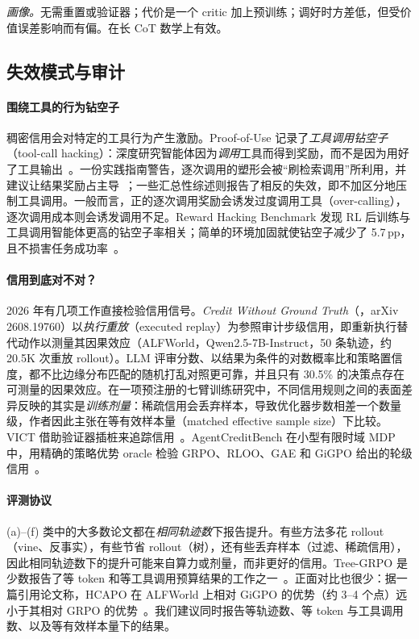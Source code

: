 \emph{画像。}无需重置或验证器；代价是一个 critic 加上预训练；调好时方差低，但受价值误差影响而有偏。在长 CoT 数学上有效。

\subsection{失效模式与审计}\label{sec:tax-failures}

\paragraph{围绕工具的行为钻空子}
稠密信用会对特定的工具行为产生激励。Proof-of-Use 记录了\emph{工具调用钻空子}（tool-call hacking）：深度研究智能体因为\emph{调用}工具而得到奖励，而不是因为用好了工具输出~\citep{proofofuse2025proof}。一份实践指南警告，逐次调用的塑形会被“刷检索调用”所利用，并建议让结果奖励占主导~\citep{fireworks2025best}；一些汇总性综述则报告了相反的失效，即不加区分地压制工具调用\unverified。一般而言，正的逐次调用奖励会诱发过度调用工具（over-calling），逐次调用成本则会诱发调用不足。Reward Hacking Benchmark 发现 RL 后训练与工具调用智能体更高的钻空子率相关；简单的环境加固就使钻空子减少了 5.7\,pp，且不损害任务成功率~\citep{rewardhacking2026benchmark}。

\paragraph{信用到底对不对？}
2026 年有几项工作直接检验信用信号。\emph{Credit Without Ground Truth}（\citealp{zhang2026credit}，arXiv 2608.19760）以\emph{执行重放}（executed replay）为参照审计步级信用，即重新执行替代动作以测量其因果效应（ALFWorld，Qwen2.5-7B-Instruct，50 条轨迹，约 20.5K 次重放 rollout）。LLM 评审分数、以结果为条件的对数概率比和策略置信度，都不比边缘分布匹配的随机打乱对照更可靠，并且只有 30.5\% 的决策点存在可测量的因果效应。在一项预注册的七臂训练研究中，不同信用规则之间的表面差异反映的其实是\emph{训练剂量}：稀疏信用会丢弃样本，导致优化器步数相差一个数量级，作者因此主张在等有效样本量（matched effective sample size）下比较\unverified。VICT 借助验证器插桩来追踪信用~\citep{vict2026verifier}\unverified。AgentCreditBench 在小型有限时域 MDP 中，用精确的策略优势 oracle 检验 GRPO、RLOO、GAE 和 GiGPO 给出的轮级信用~\citep{hectopascal2026agentcreditbench}\unverified。

\paragraph{评测协议}
(a)--(f) 类中的大多数论文都在\emph{相同轨迹数}下报告提升。有些方法多花 rollout（vine、反事实），有些节省 rollout（树），还有些丢弃样本（过滤、稀疏信用），因此相同轨迹数下的提升可能来自算力或剂量，而非更好的信用。Tree-GRPO 是少数报告了等 token 和等工具调用预算结果的工作之一~\citep{ji2025tree}。正面对比也很少：据一篇引用论文称，HCAPO 在 ALFWorld 上相对 GiGPO 的优势（约 3--4 个点）远小于其相对 GRPO 的优势~\citep{vict2026verifier}\unverified。我们建议同时报告等轨迹数、等 token 与工具调用数、以及等有效样本量下的结果。

